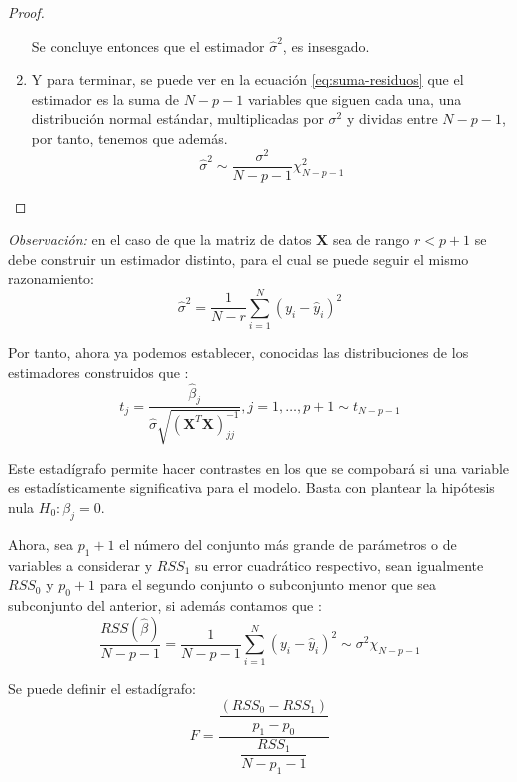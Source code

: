 \begin{propo}
\begin{proof}
\begin{enumerate}
\noindent Se concluye entonces que el estimador $\hat{\sigma}^2$, es insesgado. 
\item \noindent Y para terminar, se puede ver en la ecuación \ref{eq:suma-residuos}  que el estimador es la suma de $N-p-1$ variables que siguen cada una, una distribución normal estándar, multiplicadas por $\sigma^2$ y dividas entre $N-p-1$, por tanto, tenemos que además.
\begin{equation}
\hat{\sigma}^2\sim \dfrac{\sigma^2}{N-p-1}\chi^2_{N-p-1}
\end{equation}
\end{enumerate}
\end{proof}
\end{propo}

\noindent \emph{Observación: } en el caso de que la matriz de datos $\mathbf{X}$ sea de rango $r<p+1$ se debe construir un estimador distinto, para el cual se puede seguir el mismo razonamiento:
\begin{equation}
\hat{\sigma}^2=\dfrac{1}{N-r}\sum_{i=1}^{N}(y_i-\hat{y}_i)^2
\end{equation}

\noindent Por tanto, ahora ya podemos establecer, conocidas las distribuciones de los estimadores construidos que \cite{Greene 2008,Hastie 2001}:
\begin{equation}
t_j=\dfrac{\hat{\beta}_j}{\hat{\sigma}\sqrt{(\mathbf{X}^T\mathbf{X})^{-1}_{jj}}}, j=1,\ldots ,p+1 \sim t_{N-p-1}
\end{equation}

\noindent Este estadígrafo permite hacer contrastes en los que se compobará si una variable es estadísticamente significativa para el modelo. Basta con plantear la hipótesis nula $H_0: \beta_j=0$. 

\noindent Ahora, sea $p_1+1$ el número del conjunto más grande de parámetros o de variables a considerar y $RSS_1$ su error cuadrático respectivo, sean igualmente $RSS_0$ y $p_0+1$ para el segundo conjunto o subconjunto menor que sea subconjunto del anterior, si además contamos que :
\begin{equation}\label{eq: RSS distribucion}
\frac{RSS(\hat{\beta})}{N-p-1}=\frac{1}{N-p-1}\sum_{i=1}^N(y_i-\hat{y}_i)^2\sim \sigma^2 \chi_{N-p-1}
\end{equation}

\noindent Se puede definir el estadígrafo: 
\begin{equation}\label{ec.F}
F=\dfrac{\dfrac{(RSS_0-RSS_1)}{p_1-p_0}}{\dfrac{RSS_1}{N-p_1-1}} 
\end{equation}

